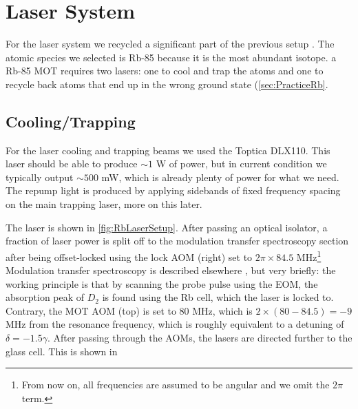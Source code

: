 \section{Laser System}\label{sec:LaserSystem}

For the laser system we recycled a significant part of the previous setup \cite{Reijnders2010}.
The atomic species we selected is Rb-85 because it is the most abundant isotope. 
a Rb-85 MOT requires two lasers: one to cool and trap the atoms and one to recycle back atoms that end up in the wrong ground state (\cref{sec:PracticeRb}.

\subsection{Cooling/Trapping}

For the laser cooling and trapping beams we used the Toptica DLX110.
This laser should be able to produce $\sim 1$ W of power, but in current condition we typically output $\sim 500$ mW, which is already plenty of power for what we need. 
The repump light is produced by applying sidebands of fixed frequency spacing on the main trapping laser, more on this later.

The laser is shown in \cref{fig:RbLaserSetup}.
After passing an optical isolator, a fraction of laser power is split off to the modulation transfer spectroscopy section after being offset-locked using the lock \ac{AOM} (right) set to $2\pi \times  84.5$ MHz\footnote{From now on, all frequencies are assumed to be angular and we omit the $2\pi$ term.}
Modulation transfer spectroscopy is described elsewhere \cite{McCarron2008,Reijnders2010}, but very briefly: the working principle is that by scanning the probe pulse using the \ac{EOM}, the absorption peak of $D_2$ is found using the Rb cell, which the laser is locked to.  
Contrary, the MOT AOM (top) is set to 80 MHz, which is $2 \times (80 - 84.5) = -9$ MHz from the resonance frequency, which is roughly equivalent to a detuning of $\delta = -1.5 \gamma$.
After passing through the AOMs, the lasers are directed further to the glass cell. 
This is shown in 

